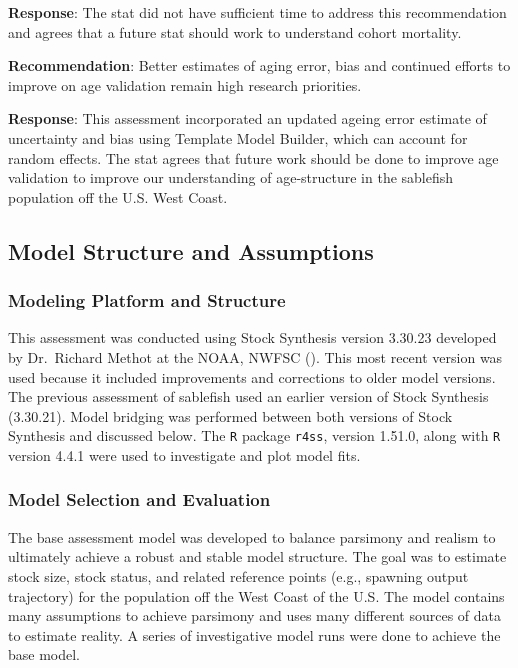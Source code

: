\documentclass[
  english,
]{article}
\begin{document}
\textbf{Response}: The \gls{stat} did not have sufficient time to
address this recommendation and agrees that a future \gls{stat} should
work to understand cohort mortality.

\textbf{Recommendation}: Better estimates of aging error, bias and
continued efforts to improve on age validation remain high research
priorities.

\textbf{Response}: This assessment incorporated an updated ageing error
estimate of uncertainty and bias using Template Model Builder, which can
account for random effects. The \gls{stat} agrees that future work
should be done to improve age validation to improve our understanding of
age-structure in the sablefish population off the U.S. West Coast.

\subsection{Model Structure and
Assumptions}\label{model-structure-and-assumptions}

\subsubsection{Modeling Platform and
Structure}\label{modeling-platform-and-structure}

This assessment was conducted using Stock Synthesis version 3.30.23
developed by Dr.~Richard Methot at the NOAA, NWFSC
(). This most
recent version was used because it included improvements and corrections
to older model versions. The previous assessment of sablefish used an
earlier version of Stock Synthesis (3.30.21). Model bridging was
performed between both versions of Stock Synthesis and discussed below.
The \texttt{R} package \texttt{r4ss}, version 1.51.0, along with
\texttt{R} version 4.4.1 were used to investigate and plot model fits.

\subsubsection{Model Selection and
Evaluation}\label{model-selection-and-evaluation}

The base assessment model was developed to balance parsimony and realism
to ultimately achieve a robust and stable model structure. The goal was
to estimate stock size, stock status, and related reference points
(e.g., spawning output trajectory) for the population off the West Coast
of the U.S. The model contains many assumptions to achieve parsimony and
uses many different sources of data to estimate reality. A series of
investigative model runs were done to achieve the base model.
\end{document}
